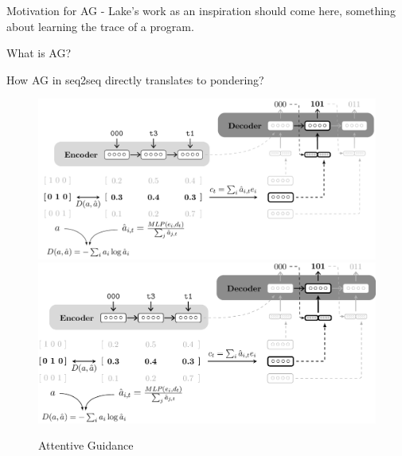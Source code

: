 Motivation for AG - Lake's work as an inspiration should come here, something about learning the trace of a program.\cite{Lake2015}

What is AG?

How AG in seq2seq directly translates to pondering?

\begin{figure}
	\begin{minipage}[t]{\textwidth}
		\ifpdf
		\includegraphics[width=\linewidth,keepaspectratio=true]{./figs/ag-model-pdf}
		\else
		\includegraphics[width=\linewidth,keepaspectratio=true]{./figs/ag-model-eps}
		\fi
		\caption{\small Attentive Guidance}
		\label{pm:ag}
	\end{minipage}
\end{figure}
